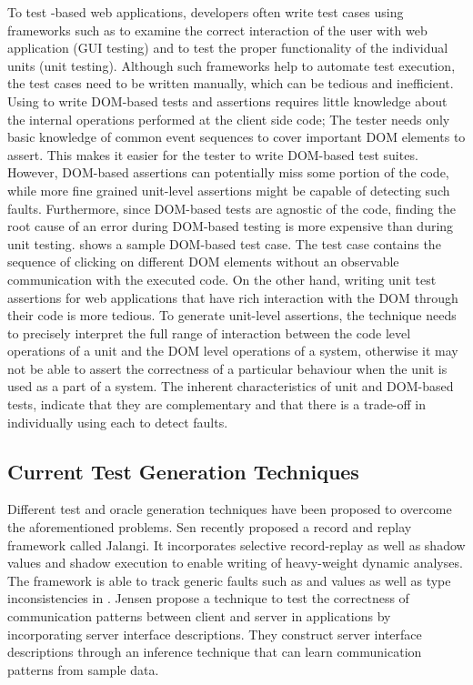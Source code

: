 To test \javascript-based web applications, developers
often write test cases using frameworks such as \selenium \cite{selenium} to examine the correct interaction of the user with web application (GUI testing) and \qunit \cite{quint} to test the proper functionality of the individual units (unit testing).
Although such frameworks help to automate test execution, the
test cases need to be written manually, which can be tedious
and inefficient. 
Using \selenium to write DOM-based tests and assertions
requires little knowledge about the internal operations performed at the client side code; The tester needs only basic knowledge of common event sequences to cover important DOM elements to assert. 
This makes it easier for the tester to write DOM-based test suites. However, DOM-based assertions can potentially miss some portion of the
code, while more fine grained unit-level assertions might be capable of detecting such faults. Furthermore, since DOM-based tests are agnostic of the \javascript code, finding the root cause of an error during DOM-based testing is more expensive than during unit testing. 
 shows a sample DOM-based test case. The test case contains the sequence of clicking on different DOM elements without an observable communication with the executed \javascript code.  
On the other hand,
writing unit test assertions for web applications that have rich interaction with the DOM through their \javascript code is more tedious. 
To generate unit-level assertions, the technique needs to precisely interpret the full range of interaction between the code level operations of a unit and the DOM level operations of a system, otherwise it may not be able to assert the correctness of a particular behaviour when the unit is used as a part of a system. The inherent characteristics of unit and DOM-based tests, indicate that they are complementary and that there is a trade-off in individually using each to detect faults. 

\subsection{Current Test Generation Techniques} 
Different test and oracle generation techniques have been proposed to overcome the aforementioned problems.
Sen \etal \cite{sen:fse13} recently proposed a record and replay framework called Jalangi. It incorporates selective record-replay as well as shadow values and shadow execution to enable writing of heavy-weight dynamic analyses.
The framework is able to track generic faults such as  and  values as well as type inconsistencies in \javascript. 
Jensen \etal \cite{jensen:fse13} propose a technique to test the correctness of communication patterns between client and server in \ajax applications by incorporating server interface descriptions.
They construct server interface descriptions through an inference technique that can learn communication patterns from sample data.


